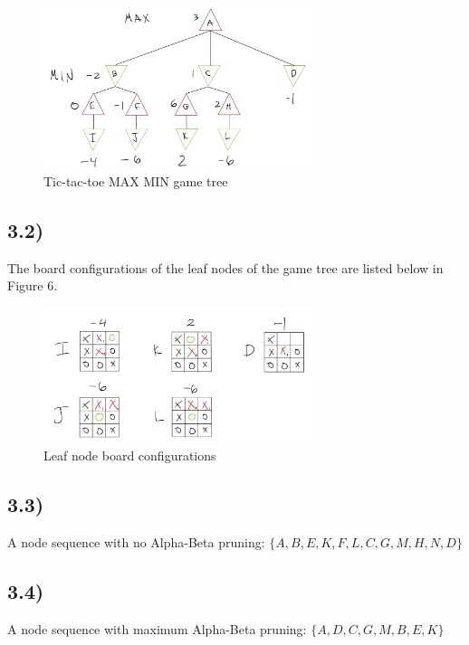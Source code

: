 \documentclass[11pt]{article}
\begin{document}
\begin{figure}[H]
\centering
\includegraphics[width=0.7\textwidth]{images/Figure_9.jpg}
\vspace{1em}

\caption{Tic-tac-toe MAX MIN game tree}
\label{fig:game_tree}
\end{figure}

\subsection*{3.2)}
The board configurations of the leaf nodes of the game tree are listed below in Figure 6.

\begin{figure}[H]
\centering
\includegraphics[width=0.7\textwidth]{images/Figure_10.jpg}
\vspace{1em}

\caption{Leaf node board configurations}
\label{fig:game_tree_leaf_nodes}
\end{figure}

\subsection*{3.3)}
\begin{flushleft}
A node sequence with no Alpha-Beta pruning: $\{A,B,E,K,F,L,C,G,M,H,N,D\}$
\end{flushleft}

\subsection*{3.4)}
\begin{flushleft}
A node sequence with maximum Alpha-Beta pruning: $\{A,D,C,G,M,B,E,K\}$
\end{flushleft}
\end{document}
